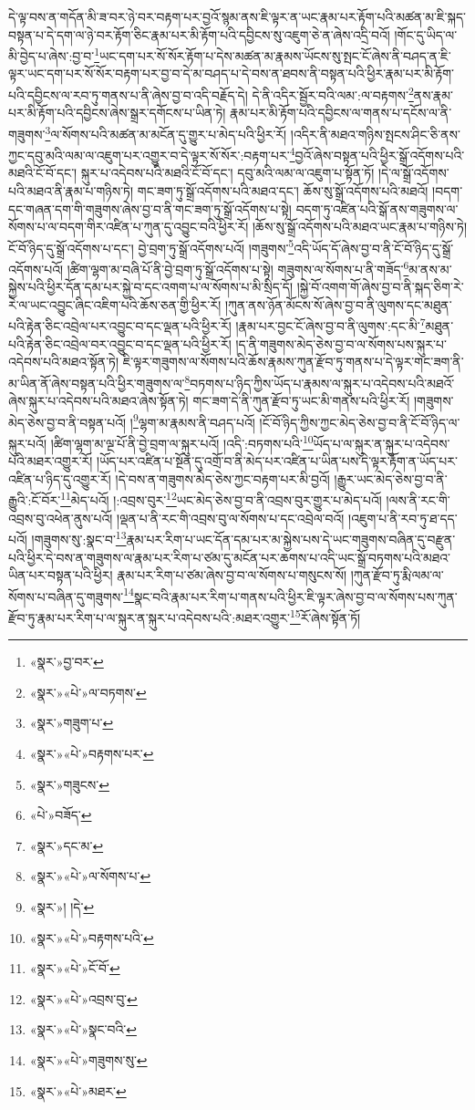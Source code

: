 དེ་ལྟ་བས་ན་གདོན་མི་ཟ་བར་ཉེ་བར་བརྟག་པར་བྱའོ་སྙམ་ནས་ཇི་ལྟར་ན་ཡང་རྣམ་པར་རྟོག་པའི་མཚན་མ་ཇི་སྐད་བསྟན་པ་དེ་དག་ལ་ཉེ་བར་རྟོག་ཅིང་རྣམ་པར་མི་རྟོག་པའི་དབྱིངས་སུ་འཇུག་ཅེ་ན་ཞེས་འདྲི་བའོ། །གོང་དུ་ཡིད་ལ་མི་བྱེད་པ་ཞེས་:བྱ་བ་\footnote{«སྣར་»བྱ་བར་}ཡང་དག་པར་སོ་སོར་རྟོག་པ་དེས་མཚན་མ་རྣམས་ཡོངས་སུ་སྤང་ངོ་ཞེས་ནི་བཤད་ན་ཇི་ལྟར་ཡང་དག་པར་སོ་སོར་བརྟག་པར་བྱ་བ་དེ་མ་བཤད་པ་དེ་བས་ན་ཐབས་ནི་བསྟན་པའི་ཕྱིར་རྣམ་པར་མི་རྟོག་པའི་དབྱིངས་ལ་རབ་ཏུ་གནས་པ་ནི་ཞེས་བྱ་བ་འདི་བརྗོད་དེ། དེ་ནི་འདིར་སྦྱོར་བའི་ལམ་:ལ་བརྟགས་\footnote{«སྣར་»«པེ་»ལ་བཏགས་}ནས་རྣམ་པར་མི་རྟོག་པའི་དབྱིངས་ཞེས་སྒྲར་དགོངས་པ་ཡིན་ཏེ། རྣམ་པར་མི་རྟོག་པའི་དབྱིངས་ལ་གནས་པ་དངོས་ལ་ནི་གཟུགས་\footnote{«སྣར་»གཟུག་པ་}ལ་སོགས་པའི་མཚན་མ་མངོན་དུ་གྱུར་པ་མེད་པའི་ཕྱིར་རོ། །འདིར་ནི་མཐའ་གཉིས་སྤངས་ཤིང་ཅི་ནས་ཀྱང་དབུ་མའི་ལམ་ལ་འཇུག་པར་འགྱུར་བ་དེ་ལྟར་སོ་སོར་:བརྟག་པར་\footnote{«སྣར་»«པེ་»བརྟགས་པར་}བྱའོ་ཞེས་བསྟན་པའི་ཕྱིར་སྒྲོ་འདོགས་པའི་མཐའི་ངོ་བོ་དང་། སྐུར་པ་འདེབས་པའི་མཐའི་ངོ་བོ་དང་། དབུ་མའི་ལམ་ལ་འཇུག་པ་སྟོན་ཏོ། །དེ་ལ་སྒྲོ་འདོགས་པའི་མཐའ་ནི་རྣམ་པ་གཉིས་ཏེ། གང་ཟག་ཏུ་སྒྲོ་འདོགས་པའི་མཐའ་དང་། ཆོས་སུ་སྒྲོ་འདོགས་པའི་མཐའོ། །བདག་དང་གཞན་དག་གི་གཟུགས་ཞེས་བྱ་བ་ནི་གང་ཟག་ཏུ་སྒྲོ་འདོགས་པ་སྟེ། བདག་ཏུ་འཛིན་པའི་སྒོ་ནས་གཟུགས་ལ་སོགས་པ་ལ་བདག་གིར་འཛིན་པ་ཀུན་དུ་འབྱུང་བའི་ཕྱིར་རོ། །ཆོས་སུ་སྒྲོ་འདོགས་པའི་མཐའ་ཡང་རྣམ་པ་གཉིས་ཏེ། ངོ་བོ་ཉིད་དུ་སྒྲོ་འདོགས་པ་དང་། བྱེ་བྲག་ཏུ་སྒྲོ་འདོགས་པའོ། །གཟུགས་\footnote{«སྣར་»གཟུངས་}འདི་ཡོད་དོ་ཞེས་བྱ་བ་ནི་ངོ་བོ་ཉིད་དུ་སྒྲོ་འདོགས་པའོ། །ཚིག་ལྷག་མ་བཞི་པོ་ནི་བྱེ་བྲག་ཏུ་སྒྲོ་འདོགས་པ་སྟེ། གཟུགས་ལ་སོགས་པ་ནི་གཟོད་\footnote{«པེ་»བཟོད་}མ་ནས་མ་སྐྱེས་པའི་ཕྱིར་དོན་དམ་པར་སྐྱེ་བ་དང་འགག་པ་ལ་སོགས་པ་མི་སྲིད་དོ། །སྐྱེ་བོ་འགག་གོ་ཞེས་བྱ་བ་ནི་སྐད་ཅིག་རེ་རེ་ལ་ཡང་འབྱུང་ཞིང་འཇིག་པའི་ཆོས་ཅན་གྱི་ཕྱིར་རོ། །ཀུན་ནས་ཉོན་མོངས་སོ་ཞེས་བྱ་བ་ནི་ལུགས་དང་མཐུན་པའི་རྟེན་ཅིང་འབྲེལ་པར་འབྱུང་བ་དང་ལྡན་པའི་ཕྱིར་རོ། །རྣམ་པར་བྱང་ངོ་ཞེས་བྱ་བ་ནི་ལུགས་:དང་མི་\footnote{«སྣར་»དང་མ་}མཐུན་པའི་རྟེན་ཅིང་འབྲེལ་བར་འབྱུང་བ་དང་ལྡན་པའི་ཕྱིར་རོ། །ད་ནི་གཟུགས་མེད་ཅེས་བྱ་བ་ལ་སོགས་པས་སྐུར་པ་འདེབས་པའི་མཐའ་སྟོན་ཏེ། ཇི་ལྟར་གཟུགས་ལ་སོགས་པའི་ཆོས་རྣམས་ཀུན་རྫོབ་ཏུ་གནས་པ་དེ་ལྟར་གང་ཟག་ནི་མ་ཡིན་ནོ་ཞེས་བསྟན་པའི་ཕྱིར་གཟུགས་ལ་\footnote{«སྣར་»«པེ་»ལ་སོགས་པ་}བཏགས་པ་ཉིད་ཀྱིས་ཡོད་པ་རྣམས་ལ་སྐུར་པ་འདེབས་པའི་མཐའོ་ཞེས་སྐུར་པ་འདེབས་པའི་མཐའ་ཞེས་སྟོན་ཏེ། གང་ཟག་དེ་ནི་ཀུན་རྫོབ་ཏུ་ཡང་མི་གནས་པའི་ཕྱིར་རོ། །གཟུགས་མེད་ཅེས་བྱ་བ་ནི་བསྟན་པའོ། །\footnote{«སྣར་»། །དེ་}ལྷག་མ་རྣམས་ནི་བཤད་པའོ། །ངོ་བོ་ཉིད་ཀྱིས་ཀྱང་མེད་ཅེས་བྱ་བ་ནི་ངོ་བོ་ཉིད་ལ་སྐུར་པའོ། །ཚིག་ལྷག་མ་ལྔ་པོ་ནི་བྱེ་བྲག་ལ་སྐུར་པའོ། །འདི་:བཏགས་པའི་\footnote{«སྣར་»«པེ་»བརྟགས་པའི་}ཡོད་པ་ལ་སྐུར་ན་སྐུར་པ་འདེབས་པའི་མཐར་འགྱུར་རོ། །ཡོད་པར་འཛིན་པ་སྔོན་དུ་འགྲོ་བ་ནི་མེད་པར་འཛིན་པ་ཡིན་པས་དེ་ལྟར་རྟོག་ན་ཡོད་པར་འཛིན་པ་ཉིད་དུ་འགྱུར་རོ། །དེ་བས་ན་གཟུགས་མེད་ཅེས་ཀྱང་བརྟག་པར་མི་བྱའོ། །རྒྱུར་ཡང་མེད་ཅེས་བྱ་བ་ནི་རྒྱུའི་:ངོ་བོར་\footnote{«སྣར་»«པེ་»ངོ་བོ་}མེད་པའོ། །:འབྲས་བུར་\footnote{«སྣར་»«པེ་»འབྲས་བུ་}ཡང་མེད་ཅེས་བྱ་བ་ནི་འབྲས་བུར་གྱུར་པ་མེད་པའོ། །ལས་ནི་རང་གི་འབྲས་བུ་འཕེན་ནུས་པའོ། །ལྡན་པ་ནི་རང་གི་འབྲས་བུ་ལ་སོགས་པ་དང་འབྲེལ་བའོ། །འཇུག་པ་ནི་རབ་ཏུ་ཐ་དད་པའོ། །གཟུགས་སུ་:སྣང་བ་\footnote{«སྣར་»«པེ་»སྣང་བའི་}རྣམ་པར་རིག་པ་ཡང་དོན་དམ་པར་མ་སྐྱེས་པས་དེ་ཡང་གཟུགས་བཞིན་དུ་བརྫུན་པའི་ཕྱིར་དེ་བས་ན་གཟུགས་ལ་རྣམ་པར་རིག་པ་ཙམ་དུ་མངོན་པར་ཆགས་པ་འདི་ཡང་སྒྲོ་བཏགས་པའི་མཐའ་ཡིན་པར་བསྟན་པའི་ཕྱིར། རྣམ་པར་རིག་པ་ཙམ་ཞེས་བྱ་བ་ལ་སོགས་པ་གསུངས་སོ། །ཀུན་རྫོབ་ཏུ་རྨི་ལམ་ལ་སོགས་པ་བཞིན་དུ་གཟུགས་\footnote{«སྣར་»«པེ་»གཟུགས་སུ་}སྣང་བའི་རྣམ་པར་རིག་པ་གནས་པའི་ཕྱིར་ཇི་ལྟར་ཞེས་བྱ་བ་ལ་སོགས་པས་ཀུན་རྫོབ་ཏུ་རྣམ་པར་རིག་པ་ལ་སྐུར་ན་སྐུར་པ་འདེབས་པའི་:མཐར་འགྱུར་\footnote{«སྣར་»«པེ་»མཐར་}རོ་ཞེས་སྟོན་ཏོ། 